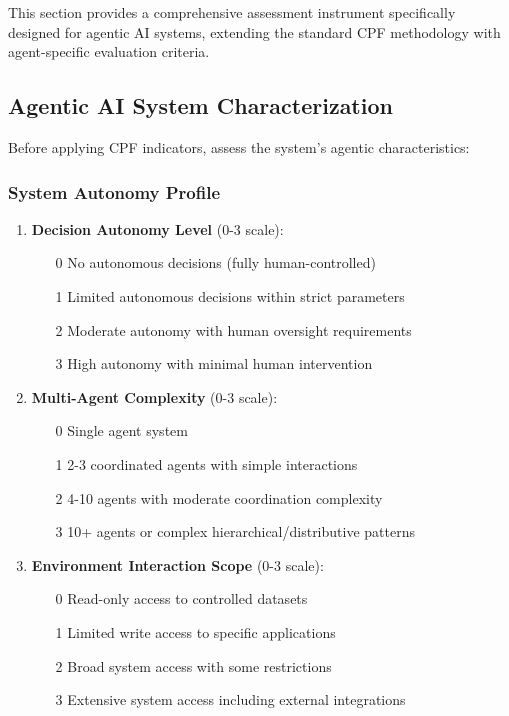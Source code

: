 \documentclass[11pt,a4paper]{article}
\begin{document}
This section provides a comprehensive assessment instrument specifically designed for agentic AI systems, extending the standard CPF methodology with agent-specific evaluation criteria.

\subsection{Agentic AI System Characterization}

Before applying CPF indicators, assess the system's agentic characteristics:

\subsubsection{System Autonomy Profile}
\begin{enumerate}
\item \textbf{Decision Autonomy Level} (0-3 scale):
   \begin{itemize}
   \item[0] No autonomous decisions (fully human-controlled)
   \item[1] Limited autonomous decisions within strict parameters
   \item[2] Moderate autonomy with human oversight requirements
   \item[3] High autonomy with minimal human intervention
   \end{itemize}

\item \textbf{Multi-Agent Complexity} (0-3 scale):
   \begin{itemize}
   \item[0] Single agent system
   \item[1] 2-3 coordinated agents with simple interactions
   \item[2] 4-10 agents with moderate coordination complexity
   \item[3] 10+ agents or complex hierarchical/distributive patterns
   \end{itemize}

\item \textbf{Environment Interaction Scope} (0-3 scale):
   \begin{itemize}
   \item[0] Read-only access to controlled datasets
   \item[1] Limited write access to specific applications
   \item[2] Broad system access with some restrictions
   \item[3] Extensive system access including external integrations
   \end{itemize}
\end{enumerate}
\end{document}
